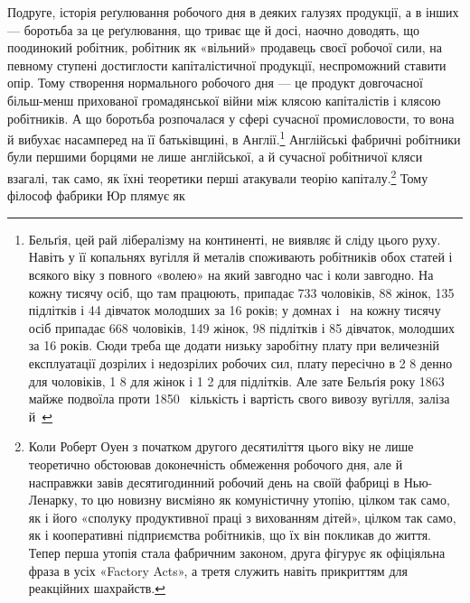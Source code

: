 Подруге, історія реґулювання робочого дня в деяких галузях
продукції, а в інших — боротьба за це реґулювання, що триває
ще й досі, наочно доводять, що поодинокий робітник, робітник як
«вільний» продавець своєї робочої сили, на певному ступені достиглости
капіталістичної продукції, неспроможний ставити опір.
Тому створення нормального робочого дня — це продукт довгочасної
більш-менш прихованої громадянської війни між клясою
капіталістів і клясою робітників. А що боротьба розпочалася
у сфері сучасної промисловости, то вона й вибухає насамперед
на її батьківщині, в Англії.\footnote{
Бельґія, цей рай лібералізму на континенті, не виявляє й сліду
цього руху. Навіть у її копальнях вугілля й металів споживають робітників
обох статей і всякого віку з повного «волею» на який завгодно час і
коли завгодно. На кожну тисячу осіб, що там працюють, припадає 733 чоловіків,
88 жінок, 135 підлітків і 44 дівчаток молодших за 16 років;
у домнах і~ на кожну тисячу осіб припадає 668 чоловіків, 149 жінок,
98 підлітків і 85 дівчаток, молодших за 16 років. Сюди треба ще додати
низьку заробітну плату при величезній експлуатації дозрілих і недозрілих
робочих сил, плату пересічно в 2 8 денно для чоловіків,
1 8 для жінок і 1 2 для підлітків.
Але зате Бельґія року 1863 майже подвоїла проти 1850~ кількість і
вартість свого вивозу вугілля, заліза й~
} Англійські фабричні робітники
були першими борцями не лише англійської, а й сучасної робітничої
кляси взагалі, так само, як їхні теоретики перші атакували
теорію капіталу.\footnote{
Коли Роберт Оуен з початком другого десятиліття цього віку не
лише теоретично обстоював доконечність обмеження робочого дня, але
й насправжки завів десятигодинний робочий день на своїй фабриці в
Нью-Ленарку, то цю новизну висміяно як комуністичну утопію, цілком
так само, як і його «сполуку продуктивної праці з вихованням дітей»,
цілком так само, як і кооперативні підприємства робітників, що їх він покликав
до життя. Тепер перша утопія стала фабричним законом, друга
фігурує як офіціяльна фраза в усіх «Factory Acts», а третя служить
навіть прикриттям для реакційних шахрайств.
} Тому філософ фабрики Юр плямує як
\parbreak{}  %
